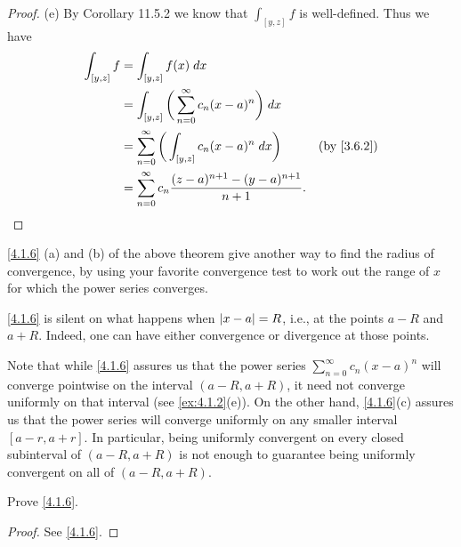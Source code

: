 \begin{proof}{(e)}
  By Corollary 11.5.2 we know that \(\int_{[y, z]} f\) is well-defined.
  Thus we have
  \begin{align*}
    \int_{[y, z]} f & = \int_{[y, z]} f(x) \; dx                                                                            \\
                    & = \int_{[y, z]} \bigg(\sum_{n = 0}^\infty c_n (x - a)^n\bigg) \; dx                                   \\
                    & = \sum_{n = 0}^\infty \bigg(\int_{[y, z]} c_n (x - a)^n \; dx\bigg)        & \text{(by \cref{3.6.2})} \\
                    & = \sum_{n = 0}^\infty c_n \frac{(z - a)^{n + 1} - (y - a)^{n + 1}}{n + 1}.
  \end{align*}
\end{proof}

\begin{note}
  \cref{4.1.6} (a) and (b) of the above theorem give another way to find the radius of convergence, by using your favorite convergence test to work out the range of \(x\) for which the power series converges.
\end{note}

\setcounter{thm}{7}
\begin{rmk}\label{4.1.8}
  \cref{4.1.6} is silent on what happens when \(\left\lvert x - a\right\rvert = R\), i.e., at the points \(a - R\) and \(a + R\).
  Indeed, one can have either convergence or divergence at those points.
\end{rmk}

\begin{rmk}\label{4.1.9}
  Note that while \cref{4.1.6} assures us that the power series \(\sum_{n = 0}^\infty c_n (x - a)^n\) will converge pointwise on the interval \((a - R, a + R)\), it need not converge uniformly on that interval
  (see \cref{ex:4.1.2}(e)).
  On the other hand, \cref{4.1.6}(c) assures us that the power series will converge uniformly on any smaller interval \([a - r, a + r]\).
  In particular, being uniformly convergent on every closed subinterval of \((a - R, a + R)\) is not enough to guarantee being uniformly convergent on all of \((a - R, a + R)\).
\end{rmk}

\exercisesection

\begin{ex}\label{ex:4.1.1}
  Prove \cref{4.1.6}.
\end{ex}

\begin{proof}
  See \cref{4.1.6}.
\end{proof}

